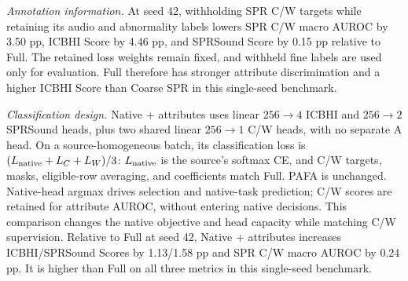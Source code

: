 \textit{Annotation information.}
At seed 42, withholding SPR C/W targets while retaining its audio and
abnormality labels lowers SPR C/W macro AUROC by 3.50 pp, ICBHI Score by
4.46 pp, and SPRSound Score by 0.15 pp relative to Full.
The retained loss weights remain fixed, and withheld fine labels are used
only for evaluation. Full therefore has stronger attribute discrimination
and a higher ICBHI Score than Coarse SPR in this single-seed benchmark.

\textit{Classification design.}
Native + attributes uses linear $256\!\to\!4$ ICBHI and $256\!\to\!2$
SPRSound heads, plus two shared linear $256\!\to\!1$ C/W heads,
with no separate A head. On a source-homogeneous batch, its classification loss is
$(L_{\rm native}+L_C+L_W)/3$: $L_{\rm native}$ is the source's softmax CE,
and C/W targets, masks, eligible-row averaging, and coefficients match Full.
PAFA is unchanged. Native-head argmax drives selection and native-task
prediction; C/W scores are retained for attribute AUROC, without entering
native decisions. This comparison changes the native objective and head
capacity while matching C/W supervision. Relative to Full at seed 42,
Native + attributes increases ICBHI/SPRSound Scores by 1.13/1.58 pp
and SPR C/W macro AUROC by 0.24 pp. It is higher than Full on all three metrics
in this single-seed benchmark.
